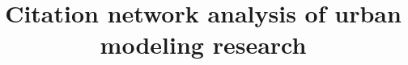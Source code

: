 


\begin{frontmatter}

\begin{fmbox}

\title{Citation network analysis of urban modeling research}

\author[
   addressref={aff1,aff2,aff3},                   %
   corref={aff1},                       %
   email={juste.raimbault@polytechnique.edu}   %
]{ }
\author[
   addressref={aff2},
   email={m.vanhoof@ucl.ac.uk}
]{ }
\author[
   addressref={aff2},
   email={m.batty@ucl.ac.uk}
]{ }


\address[id=aff1]{%
  , %
  ,                              %
}
\address[id=aff2]{%
  ,
  ,
}
\address[id=aff3]{%
  ,
  ,
}

\begin{artnotes}
\end{artnotes}

\end{fmbox}%

\begin{abstractbox}


\end{abstractbox}
\end{frontmatter}

